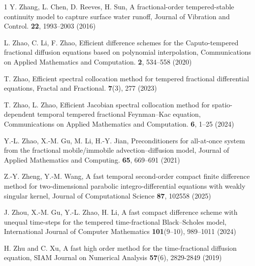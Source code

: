 \documentclass[10pt, reqno]{amsart}
\theoremstyle{remark}
\theoremstyle{definition}
\numberwithin{table}{section}
\begin{document}
\begin{thebibliography}{1}
Y. Zhang, L. Chen, D. Reeves, H. Sun, A fractional-order tempered-stable continuity model to capture surface water runoff, Journal of Vibration and Control. \textbf{22}, 1993--2003 (2016)

L. Zhao, C. Li, F. Zhao, Efficient difference schemes for the Caputo-tempered fractional diffusion equations based on polynomial interpolation, Communications on Applied Mathematics and Computation. \textbf{2}, 534--558 (2020)

T. Zhao, Efficient spectral collocation method for tempered fractional differential equations, Fractal and Fractional. \textbf{7}(3), 277 (2023)

T. Zhao, L. Zhao, Efficient Jacobian spectral collocation method for spatio-dependent temporal tempered fractional Feynman–Kac equation, Communications on Applied Mathematics and Computation. \textbf{6}, 1--25 (2024)

Y.-L. Zhao, X.-M. Gu, M. Li, H.-Y. Jian, Preconditioners for all-at-once system from the fractional mobile/immobile advection–diffusion model, Journal of Applied Mathematics and Computing. \textbf{65}, 669--691 (2021)

Z.-Y. Zheng, Y.-M. Wang, A fast temporal second-order compact finite difference method for two-dimensional parabolic integro-differential equations with weakly singular kernel, Journal of Computational Science \textbf{87}, 102558 (2025)

J. Zhou, X.-M. Gu, Y.-L. Zhao, H. Li, A fast compact difference scheme with unequal time-steps for the tempered time-fractional Black–Scholes model, International Journal of Computer Mathematics \textbf{101}(9--10), 989--1011 (2024)

H. Zhu and C. Xu, A fast high order method for the time-fractional diffusion equation, SIAM Journal on Numerical Analysis \textbf{57}(6), 2829-2849 (2019)

\end{thebibliography}
\end{document}
